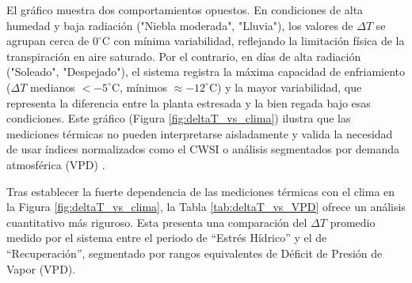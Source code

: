 El gráfico muestra dos comportamientos opuestos. En condiciones de alta humedad y baja radiación ("Niebla moderada", "Lluvia"), los valores de $\Delta T$ se agrupan cerca de $0^{\circ}$C con mínima variabilidad, reflejando la limitación física de la transpiración en aire saturado. Por el contrario, en días de alta radiación ("Soleado", "Despejado"), el sistema registra la máxima capacidad de enfriamiento ($\Delta T$ medianos $<-5^{\circ}$C, mínimos $\approx -12^{\circ}$C) y la mayor variabilidad, que representa la diferencia entre la planta estresada y la bien regada bajo esas condiciones. Este gráfico (Figura \ref{fig:deltaT_vs_clima}) ilustra que las mediciones térmicas no pueden interpretarse aisladamente y valida la necesidad de usar índices normalizados como el CWSI o análisis segmentados por demanda atmosférica (VPD) .

Tras establecer la fuerte dependencia de las mediciones térmicas con el clima en la Figura \ref{fig:deltaT_vs_clima}, la Tabla \ref{tab:deltaT_vs_VPD} ofrece un análisis cuantitativo más riguroso. Esta presenta una comparación del $\Delta T$ promedio medido por el sistema entre el periodo de ``Estrés Hídrico'' y el de ``Recuperación'', segmentado por rangos equivalentes de Déficit de Presión de Vapor (VPD).

